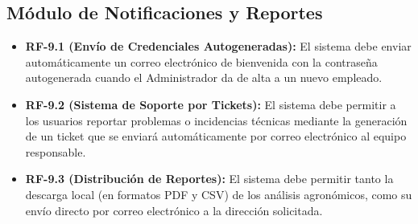 \subsection{Módulo de Notificaciones y Reportes}
\begin{itemize}
    \item \textbf{RF-9.1 (Envío de Credenciales Autogeneradas):} El sistema debe enviar automáticamente un correo electrónico de bienvenida con la contraseña autogenerada cuando el Administrador da de alta a un nuevo empleado.
    \item \textbf{RF-9.2 (Sistema de Soporte por Tickets):} El sistema debe permitir a los usuarios reportar problemas o incidencias técnicas mediante la generación de un ticket que se enviará automáticamente por correo electrónico al equipo responsable.
    \item \textbf{RF-9.3 (Distribución de Reportes):} El sistema debe permitir tanto la descarga local (en formatos PDF y CSV) de los análisis agronómicos, como su envío directo por correo electrónico a la dirección solicitada.
\end{itemize}

